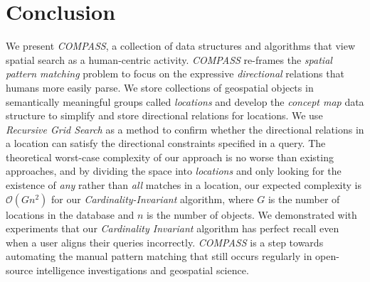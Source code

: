 \section{Conclusion}
\label{section:conclusion}
\normalsize
We present \emph{COMPASS}, a collection of data structures and algorithms that view spatial search as a human-centric activity. 
\emph{COMPASS} re-frames the \textit{spatial pattern matching} problem to focus on the expressive \textit{directional} relations that humans more easily parse. 
%
We store collections of geospatial objects in semantically meaningful groups called \textit{locations} and develop the \textit{concept map} data structure to simplify and store directional relations for locations. 
We use \textit{Recursive Grid Search} as a method to confirm whether the directional relations in a location can satisfy the directional constraints specified in a query. 
%
The theoretical worst-case complexity of our approach is no worse than existing approaches, and by dividing the space into \textit{locations} and only looking for the existence of \textit{any} rather than \textit{all} matches in a location, our expected complexity is $\mathcal{O}(Gn^{2})$ for our \textit{Cardinality-Invariant} algorithm, where $G$ is the number of locations in the database and $n$ is the number of objects. We demonstrated with experiments that our \textit{Cardinality Invariant} algorithm has perfect recall even when a user aligns their queries incorrectly.
%
\emph{COMPASS} is a step towards automating the manual pattern matching that still occurs regularly in open-source intelligence investigations and geospatial science.
%
%
